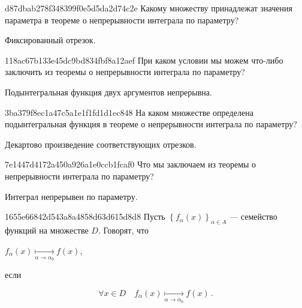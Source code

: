 \begin{note}{d87dbab278f348399f0e5d5da2d74c2e}
    Какому множеству принадлежат значения параметра в теореме о непрерывности интеграла по параметру?

    \begin{cloze}{1}
        Фиксированный отрезок.
    \end{cloze}
\end{note}

\begin{note}{118ac67b133e45dc9bd834fbf8a12aef}
    При каком условии мы можем что-либо заключить из теоремы о непрерывности интеграла по параметру?

    \begin{cloze}{1}
        Подынтегральная функция двух аргументов непрерывна.
    \end{cloze}
\end{note}

\begin{note}{3ba379f8ec1a47c5a1e1f1fd1d1ec848}
    На каком множестве определена подынтегральная функция в теореме о непрерывности интеграла по параметру?

    \begin{cloze}{1}
        Декартово произведение соответствующих отрезков.
    \end{cloze}
\end{note}

\begin{note}{7e1447d4172a450a926a1e0ccb1fcaf0}
    Что мы заключаем из теоремы о непрерывности интеграла по параметру?

    \begin{cloze}{1}
        Интеграл непрерывен по параметру.
    \end{cloze}
\end{note}

\begin{note}{1655e66842d543a8a4858d63d615d8d8}
    Пусть \({ \left\{ f_\alpha (x) \right\}_{\alpha \in A} }\) --- семейство функций на множестве \({ D }\).
    Говорят, что \begin{icloze}{2}\({ f_{\alpha}(x) \underset{\alpha \to \alpha_0}{\mapsto} f(x) }\),\end{icloze} если
    \begin{icloze}{1}
        \[
            \forall x \in D \quad f_{\alpha}(x) \underset{\alpha \to \alpha_0}{\mapsto} f(x)\,.
        \]
    \end{icloze}
\end{note}

